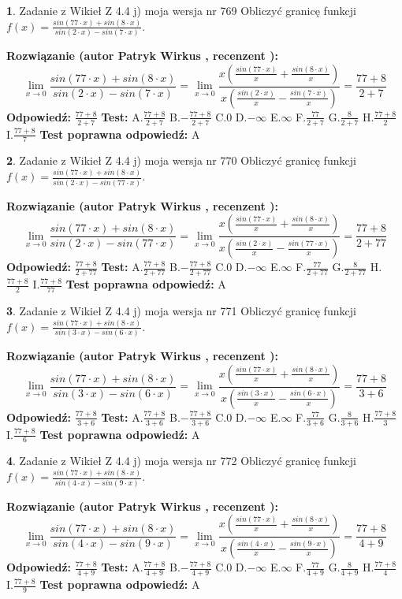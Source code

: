 \documentclass[12pt, a4paper]{article}
\theoremstyle{definition} %
\newtheorem{zad}{}
\newcommand{\zadStart}[1]{\begin{zad}#1\newline}
\newcommand{\zadStop}{\end{zad}}
\newcommand{\rozwStart}[2]{\noindent \textbf{Rozwiązanie (autor #1 , recenzent #2): }\newline}
\newcommand{\rozwStop}{\newline}
\newcommand{\odpStart}{\noindent \textbf{Odpowiedź:}\newline}
\newcommand{\odpStop}{\newline}
\newcommand{\testStart}{\noindent \textbf{Test:}\newline}
\newcommand{\testStop}{\newline}
\newcommand{\kluczStart}{\noindent \textbf{Test poprawna odpowiedź:}\newline}
\newcommand{\kluczStop}{\newline}
\begin{document}
\zadStart{Zadanie z Wikieł Z 4.4 j) moja wersja nr 769}
Obliczyć granicę funkcji $f(x)=\frac{sin(77\cdot x) +sin(8\cdot x)}{sin(2\cdot x) -sin(7\cdot x)}$.
\zadStop
\rozwStart{Patryk Wirkus}{}
$$\lim\limits_{x\to 0}\frac{sin(77\cdot x) +sin(8\cdot x)}{sin(2\cdot x) -sin(7\cdot x)}=\lim\limits_{x\to 0}\frac{x(\frac{sin(77\cdot x)}{x}+\frac{sin(8\cdot x)}{x})}{x(\frac{sin(2\cdot x)}{x}-\frac{sin(7\cdot x)}{x})}=\frac{77+8}{2+7}$$
\rozwStop
\odpStart
$\frac{77+8}{2+7}$
\odpStop
\testStart
A.$\frac{77+8}{2+7}$
B.$-\frac{77+8}{2+7}$
C.$0$
D.$-\infty$
E.$\infty$
F.$\frac{77}{2+7}$
G.$\frac{8}{2+7}$
H.$\frac{77+8}{2}$
I.$\frac{77+8}{7}$
\testStop
\kluczStart
A
\kluczStop



\zadStart{Zadanie z Wikieł Z 4.4 j) moja wersja nr 770}
Obliczyć granicę funkcji $f(x)=\frac{sin(77\cdot x) +sin(8\cdot x)}{sin(2\cdot x) -sin(77\cdot x)}$.
\zadStop
\rozwStart{Patryk Wirkus}{}
$$\lim\limits_{x\to 0}\frac{sin(77\cdot x) +sin(8\cdot x)}{sin(2\cdot x) -sin(77\cdot x)}=\lim\limits_{x\to 0}\frac{x(\frac{sin(77\cdot x)}{x}+\frac{sin(8\cdot x)}{x})}{x(\frac{sin(2\cdot x)}{x}-\frac{sin(77\cdot x)}{x})}=\frac{77+8}{2+77}$$
\rozwStop
\odpStart
$\frac{77+8}{2+77}$
\odpStop
\testStart
A.$\frac{77+8}{2+77}$
B.$-\frac{77+8}{2+77}$
C.$0$
D.$-\infty$
E.$\infty$
F.$\frac{77}{2+77}$
G.$\frac{8}{2+77}$
H.$\frac{77+8}{2}$
I.$\frac{77+8}{77}$
\testStop
\kluczStart
A
\kluczStop



\zadStart{Zadanie z Wikieł Z 4.4 j) moja wersja nr 771}
Obliczyć granicę funkcji $f(x)=\frac{sin(77\cdot x) +sin(8\cdot x)}{sin(3\cdot x) -sin(6\cdot x)}$.
\zadStop
\rozwStart{Patryk Wirkus}{}
$$\lim\limits_{x\to 0}\frac{sin(77\cdot x) +sin(8\cdot x)}{sin(3\cdot x) -sin(6\cdot x)}=\lim\limits_{x\to 0}\frac{x(\frac{sin(77\cdot x)}{x}+\frac{sin(8\cdot x)}{x})}{x(\frac{sin(3\cdot x)}{x}-\frac{sin(6\cdot x)}{x})}=\frac{77+8}{3+6}$$
\rozwStop
\odpStart
$\frac{77+8}{3+6}$
\odpStop
\testStart
A.$\frac{77+8}{3+6}$
B.$-\frac{77+8}{3+6}$
C.$0$
D.$-\infty$
E.$\infty$
F.$\frac{77}{3+6}$
G.$\frac{8}{3+6}$
H.$\frac{77+8}{3}$
I.$\frac{77+8}{6}$
\testStop
\kluczStart
A
\kluczStop



\zadStart{Zadanie z Wikieł Z 4.4 j) moja wersja nr 772}
Obliczyć granicę funkcji $f(x)=\frac{sin(77\cdot x) +sin(8\cdot x)}{sin(4\cdot x) -sin(9\cdot x)}$.
\zadStop
\rozwStart{Patryk Wirkus}{}
$$\lim\limits_{x\to 0}\frac{sin(77\cdot x) +sin(8\cdot x)}{sin(4\cdot x) -sin(9\cdot x)}=\lim\limits_{x\to 0}\frac{x(\frac{sin(77\cdot x)}{x}+\frac{sin(8\cdot x)}{x})}{x(\frac{sin(4\cdot x)}{x}-\frac{sin(9\cdot x)}{x})}=\frac{77+8}{4+9}$$
\rozwStop
\odpStart
$\frac{77+8}{4+9}$
\odpStop
\testStart
A.$\frac{77+8}{4+9}$
B.$-\frac{77+8}{4+9}$
C.$0$
D.$-\infty$
E.$\infty$
F.$\frac{77}{4+9}$
G.$\frac{8}{4+9}$
H.$\frac{77+8}{4}$
I.$\frac{77+8}{9}$
\testStop
\kluczStart
A
\kluczStop
\end{document}
